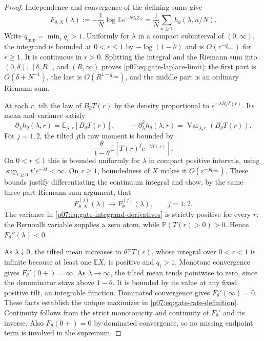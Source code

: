 \documentclass[11pt,letterpaper]{article}
\theoremstyle{definition}
\theoremstyle{remark}
\newcommand{\E}{\mathbb E}
\newcommand{\Pp}{\mathbb P}
\newcommand{\1}{\mathbf 1}
\begin{document}
\begin{proof}
Independence and convergence of the defining sums give
\begin{equation}\label{p07:eq:gate-discrete-free-energy}
 F_{\theta,N}(\lambda):=-\frac1N\log\E e^{-N\lambda Z_N}
 =\frac1N\sum_{n\geq1}h_\theta(\lambda,n/N).
\end{equation}
Write $q_{\min}=\min_iq_i>1$. Uniformly for $\lambda$ in a compact
subinterval of $(0,\infty)$, the integrand is bounded at $0<r\leq1$
by $-\log(1-\theta)$ and is $O(r^{-q_{\min}})$ for $r\geq1$.
It is continuous in $r>0$. Splitting the integral and the Riemann sum
into $(0,\delta)$, $[\delta,R]$, and $(R,\infty)$ proves
\eqref{p07:eq:gate-laplace-limit}: the first part is $O(\delta+N^{-1})$,
the last is $O(R^{1-q_{\min}})$, and the middle part is an ordinary
Riemann sum.

At each $r$, tilt the law of $B_\theta T(r)$ by the density proportional
to $e^{-\lambda B_\theta T(r)}$. Its mean and variance satisfy
\begin{equation}\label{p07:eq:gate-integrand-derivatives}
 \partial_\lambda h_\theta(\lambda,r)
       =\E_{\lambda,r}[B_\theta T(r)],\qquad
 -\partial_\lambda^2 h_\theta(\lambda,r)
       =\operatorname{Var}_{\lambda,r}(B_\theta T(r)).
\end{equation}
For $j=1,2$, the tilted $j$th raw moment is bounded by
\[
 \frac{\theta}{1-\theta}\E[T(r)^j e^{-\lambda T(r)}].
\]
On $0<r\leq1$ this is bounded uniformly for $\lambda$ in compact
positive intervals, using $\sup_{t\geq0}t^je^{-\lambda t}<\infty$.
On $r\geq1$, boundedness of $X$ makes it $O(r^{-j q_{\min}})$.
These bounds justify differentiating the continuum integral and show,
by the same three-part Riemann-sum argument, that
\begin{equation}\label{p07:eq:gate-derivative-convergence}
 F_{\theta,N}^{(j)}(\lambda)\longrightarrow
 F_\theta^{(j)}(\lambda),\qquad j=1,2.
\end{equation}
The variance in \eqref{p07:eq:gate-integrand-derivatives} is strictly
positive for every $r$: the Bernoulli variable supplies a zero atom,
while $\Pp(T(r)>0)>0$. Hence $F_\theta''(\lambda)<0$.

As $\lambda\downarrow0$, the tilted mean increases to
$\theta\E T(r)$, whose integral over $0<r<1$ is infinite because
at least one $\E X_i$ is positive and $q_i>1$. Monotone convergence
gives $F_\theta'(0+)=\infty$. As $\lambda\to\infty$, the tilted
mean tends pointwise to zero, since the denominator stays above
$1-\theta$. It is bounded by its value at any fixed positive tilt,
an integrable function. Dominated convergence gives
$F_\theta'(\infty)=0$. These facts establish the unique maximizer in
\eqref{p07:eq:gate-rate-definition}. Continuity follows from the strict
monotonicity and continuity of $F_\theta'$ and its inverse. Also
$F_\theta(0+)=0$ by dominated convergence, so no missing endpoint
term is involved in the supremum.


\end{proof}
\end{document}
